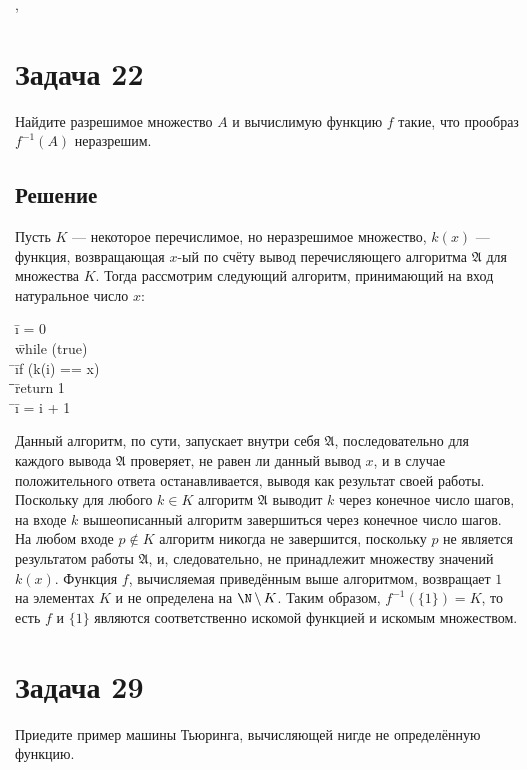 \documentclass[a4paper,12pt]{article}
\newcommand {\gu} [1] {\guillemotleft#1\guillemotright}
\newcommand{\tab}{\quad\=}
\newenvironment{programm}{
    \ttfamily
    \begin{tabbing}
    }
    {
    \end{tabbing}
}
\begin{document}
	\sep
	
	\section*{Задача 22}
	Найдите разрешимое множество $A$ и вычислимую функцию $f$ такие, что прообраз $f^{-1}(A)$ неразрешим.
	\subsection*{Решение}
	Пусть $K$ --- некоторое перечислимое, но неразрешимое множество, $k(x)$ --- функция, возвращающая $x$-ый по счёту вывод перечисляющего алгоритма $\mathfrak{A}$ для множества $K$. Тогда рассмотрим следующий алгоритм, принимающий на вход натуральное число $x$:
	\begin{programm}
	\tab i = 0\\
	\tab while (true)\\
	\tab \tab if (k(i) == x)\\
	\tab \tab \tab return 1\\
	\tab \tab i = i + 1\\
	\end{programm}
	
	Данный алгоритм, по сути, запускает внутри себя $\mathfrak{A}$, последовательно для каждого вывода $\mathfrak{A}$ проверяет, не равен ли данный вывод $x$, и в случае положительного ответа останавливается, выводя \gu{1} как результат своей работы. Поскольку для любого $k\in K$ алгоритм $\mathfrak{A}$ выводит $k$ через конечное число шагов, на входе $k$ вышеописанный алгоритм завершиться через конечное число шагов. На любом входе $p\not\in K$ алгоритм никогда не завершится, поскольку $p$ не является результатом работы $\mathfrak{A}$, и, следовательно, не принадлежит множеству значений $k(x)$. Функция $f$, вычисляемая приведённым выше алгоритмом, возвращает $1$ на элементах $K$ и не определена на $\N\,\backslash\,K$. Таким образом, $f^{-1}(\{1\})=K$, то есть $f$ и $\{1\}$ являются соответственно искомой функцией и искомым множеством.
    
	\section*{Задача 29}
    Приедите пример машины Тьюринга, вычисляющей нигде не определённую функцию.
\end{document}
